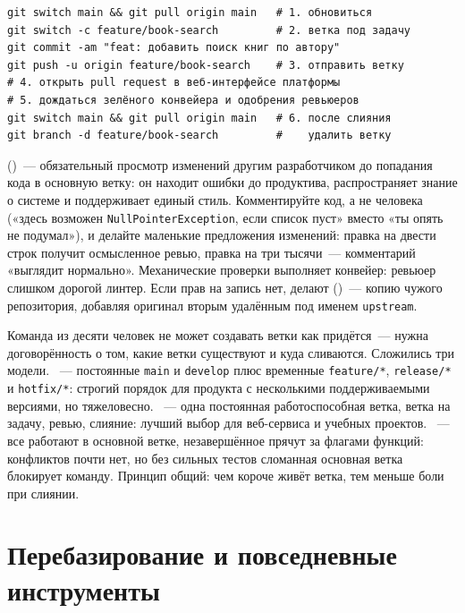 \begin{listing}[H]
\begin{verbatim}
git switch main && git pull origin main   # 1. обновиться
git switch -c feature/book-search         # 2. ветка под задачу
git commit -am "feat: добавить поиск книг по автору"
git push -u origin feature/book-search    # 3. отправить ветку
# 4. открыть pull request в веб-интерфейсе платформы
# 5. дождаться зелёного конвейера и одобрения ревьюеров
git switch main && git pull origin main   # 6. после слияния
git branch -d feature/book-search         #    удалить ветку
\end{verbatim}
\caption{Жизненный цикл одной задачи}
\label{lst:12-9}
\end{listing}

 ()~--- обязательный просмотр изменений другим разработчиком до попадания кода в основную ветку: он находит ошибки до продуктива, распространяет знание о системе и поддерживает единый стиль. Комментируйте код, а не человека («здесь возможен \texttt{NullPointerException}, если список пуст» вместо «ты опять не подумал»), и делайте маленькие предложения изменений: правка на двести строк получит осмысленное ревью, правка на три тысячи~--- комментарий «выглядит нормально». Механические проверки выполняет конвейер: ревьюер слишком дорогой линтер. Если прав на запись нет, делают  ()~--- копию чужого репозитория, добавляя оригинал вторым удалённым под именем \texttt{upstream}.

Команда из десяти человек не может создавать ветки как придётся~--- нужна договорённость о том, какие ветки существуют и куда сливаются. Сложились три модели. ~--- постоянные \texttt{main} и \texttt{develop} плюс временные \texttt{feature/*}, \texttt{release/*} и \texttt{hotfix/*}: строгий порядок для продукта с несколькими поддерживаемыми версиями, но тяжеловесно. ~--- одна постоянная работоспособная ветка, ветка на задачу, ревью, слияние: лучший выбор для веб-сервиса и учебных проектов. ~--- все работают в основной ветке, незавершённое прячут за флагами функций: конфликтов почти нет, но без сильных тестов сломанная основная ветка блокирует команду. Принцип общий: чем короче живёт ветка, тем меньше боли при слиянии.

\section{Перебазирование и повседневные инструменты}

